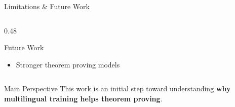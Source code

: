 \documentclass[aspectratio=169]{beamer}
\begin{document}
\begin{frame}{Limitations \& Future Work}
\begin{columns}[T,onlytextwidth]
\begin{column}{0.48\textwidth}
\begin{block}{Future Work}
\begin{itemize}
    \item Stronger theorem proving models
\end{itemize}

\end{block}

\end{column}

\end{columns}

\vspace{0.45cm}

\begin{alertblock}{Main Perspective}
\centering
\large This work is an initial step toward understanding \textbf{why multilingual training helps theorem proving}.
\end{alertblock}

\end{frame}
\end{document}
